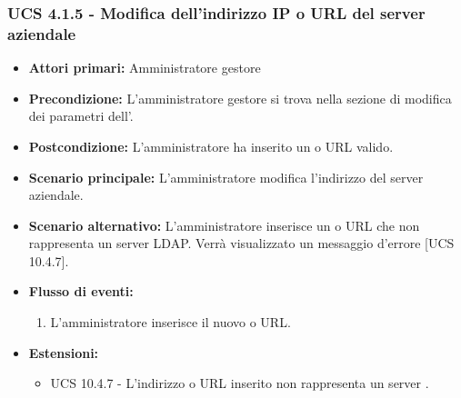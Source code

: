 \subsubsection{UCS 4.1.5 - Modifica dell'indirizzo IP o URL del server aziendale}
\begin{itemize}
	\item \textbf{Attori primari:} Amministratore gestore
	\item \textbf{Precondizione:} L'amministratore gestore si trova nella sezione di modifica dei parametri dell'.
	\item \textbf{Postcondizione:} L'amministratore ha inserito un  o URL valido.
	\item \textbf{Scenario principale:} L'amministratore modifica l'indirizzo del server aziendale.
	\item \textbf{Scenario alternativo:} L'amministratore inserisce un  o URL che non rappresenta un server LDAP. Verrà visualizzato un messaggio d'errore [UCS 10.4.7].
	\item \textbf{Flusso di eventi:}
	\begin{enumerate}
		\item L'amministratore inserisce il nuovo  o URL.
	\end{enumerate}
	\item \textbf{Estensioni:}
	\begin{itemize}
		\item UCS 10.4.7 - L'indirizzo  o URL inserito non rappresenta un server .
	\end{itemize}
\end{itemize}




